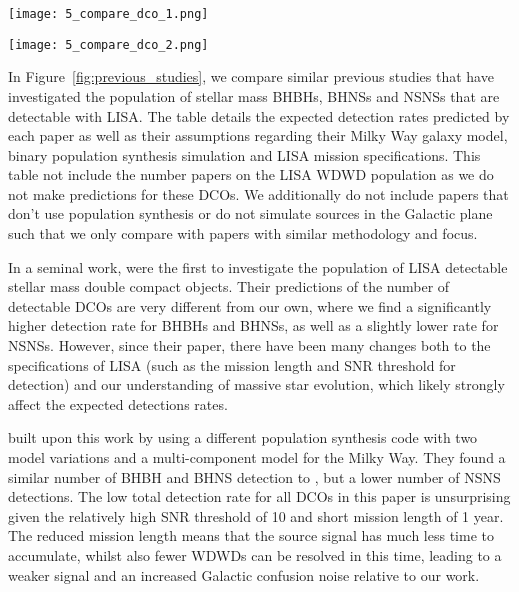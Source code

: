 \begin{figure*}[p]
    \centering
    \texttt{[image: 5\_compare\_dco\_1.png]}

    \vspace{0.5cm}

    \texttt{[image: 5\_compare\_dco\_2.png]}
    \caption{A table comparing previous studies of a similar nature to this work. The works listed in the table are \citet{Nelemans+2001,Belczynski+2010,Liu+2014,Lamberts+2018,Lau+2020,Breivik+2020,Sesana+2020}.}
    \label{fig:previous_studies}
\end{figure*}

In Figure~\ref{fig:previous_studies}, we compare similar previous studies that have investigated the population of stellar mass BHBHs, BHNSs and NSNSs that are detectable with LISA. The table details the expected detection rates predicted by each paper as well as their assumptions regarding their Milky Way galaxy model, binary population synthesis simulation and LISA mission specifications. This table not include the number papers on the LISA WDWD population as we do not make predictions for these DCOs. We additionally do not include papers that don't use population synthesis or do not simulate sources in the Galactic plane \citep[e.g.][]{Andrews+2020, Kremer+2018} such that we only compare with papers with similar methodology and focus.

In a seminal work, \citet{Nelemans+2001} were the first to investigate the population of LISA detectable stellar mass double compact objects. Their predictions of the number of detectable DCOs are very different from our own, where we find a significantly higher detection rate for BHBHs and BHNSs, as well as a slightly lower rate for NSNSs. However, since their paper, there have been many changes both to the specifications of LISA (such as the mission length and SNR threshold for detection) and our understanding of massive star evolution, which likely strongly affect the expected detections rates.

\citet{Belczynski+2010} built upon this work by using a different population synthesis code with two model variations and a multi-component model for the Milky Way. They found a similar number of BHBH and BHNS detection to \citet{Nelemans+2001}, but a lower number of NSNS detections. The low total detection rate for all DCOs in this paper is unsurprising given the relatively high SNR threshold of 10 and short mission length of 1 year. The reduced mission length means that the source signal has much less time to accumulate, whilst also fewer WDWDs can be resolved in this time, leading to a weaker signal and an increased Galactic confusion noise relative to our work.

